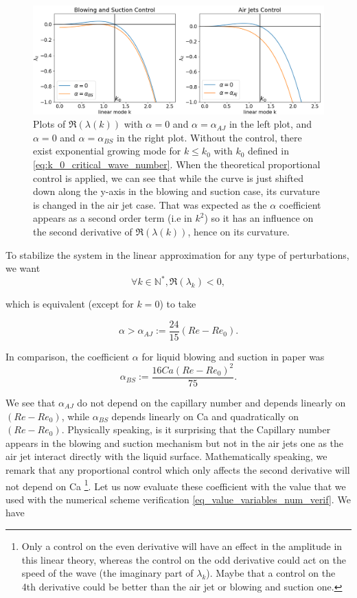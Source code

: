 \documentclass[12pt]{article}
\begin{document}
\begin{figure}[h]
\includegraphics[width=1\textwidth]{Control_experiments/lambda_k_BS_AJ.png}
\caption{Plots of $\mathfrak{R}(\lambda(k))$ with $\alpha = 0$ and $\alpha = \alpha_{AJ} $ in the left plot, and $\alpha = 0$ 
and $\alpha = \alpha_{BS}$ in the right plot. Without the control, there exist exponential growing mode for $k\leq k_0$ with $k_0$ defined in \eqref{eq:k_0_critical_wave_number}. When the theoretical proportional control is applied, we can see that while the curve is just shifted down along the y-axis in the blowing and 
suction case, its curvature is changed in the air jet case. That was expected as the $\alpha$ coefficient appears as a second order 
term (i.e in $k^2$) so it has an influence on the second derivative of $\mathfrak{R}(\lambda(k))$, hence on its curvature.}
\label{fig:prop_ctrl_lambda_k}
\end{figure}


To stabilize the system in the linear approximation for any type of perturbations, we want $$\forall k \in \mathbb{N}^*, \mathfrak{R}(\lambda_k) <0,$$

which is equivalent (except for $k=0$) to take 

\begin{equation}\label{eq:alpha_AJ}
    \boxed{
    \alpha > \alpha_{AJ}:= \frac{24}{15}(Re-Re_0).
    }
\end{equation}


In comparison, the coefficient $\alpha$ for liquid blowing and suction in paper \cite{Thompson_2016_prop_ctrl} was 
\begin{equation}
    \alpha_{BS} := \frac{16Ca(Re-Re_0)^2}{75}.
\end{equation}

We see that $\alpha_{AJ}$ do not depend on the capillary number and depends linearly on $(Re-Re_0)$, while $\alpha_{BS}$
 depends linearly on Ca and quadratically on $(Re-Re_0)$. Physically speaking, is it surprising that the Capillary number 
 appears in the blowing and suction mechanism but not in the air jets one as the air jet interact directly with the liquid 
 surface. Mathematically speaking, we remark that any proportional control which only affects the second derivative will not 
 depend on Ca \footnote{Only a control on the even derivative will have an effect in the amplitude in this linear theory, whereas 
 the control on the odd derivative could act on the speed of the wave (the imaginary part of $\lambda_k$). Maybe that a control on 
 the 4th derivative could be better than the air jet or blowing and suction one.}. Let us now evaluate these coefficient with the 
 value that we used with the numerical scheme verification \eqref{eq_value_variables_num_verif}. We have 
\end{document}

